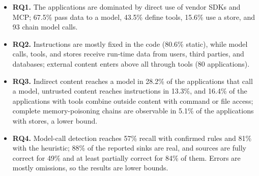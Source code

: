 \begin{itemize}
  \item \textbf{RQ1.} The applications are dominated by direct use of vendor SDKs and MCP; 67.5\% pass data to a model, 43.5\% define tools, 15.6\% use a store, and 93 chain model calls.
  \item \textbf{RQ2.} Instructions are mostly fixed in the code (80.6\% static), while model calls, tools, and stores receive run-time data from users, third parties, and databases; external content enters above all through tools (80 applications).
  \item \textbf{RQ3.} Indirect content reaches a model in 28.2\% of the applications that call a model, untrusted content reaches instructions in 13.3\%, and 16.4\% of the applications with tools combine outside content with command or file access; complete memory-poisoning chains are observable in 5.1\% of the applications with stores, a lower bound.
  \item \textbf{RQ4.} Model-call detection reaches 57\% recall with confirmed rules and 81\% with the heuristic; 88\% of the reported sinks are real, and sources are fully correct for 49\% and at least partially correct for 84\% of them. Errors are mostly omissions, so the results are lower bounds.
\end{itemize}